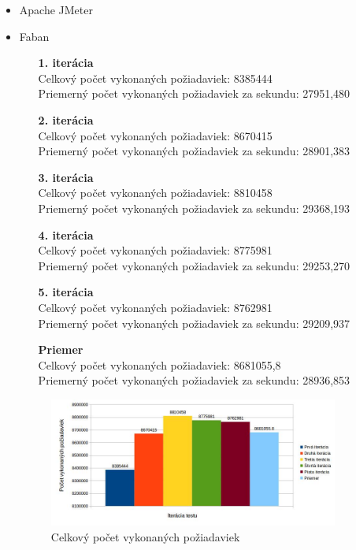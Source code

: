 \documentclass[12pt,oneside,final]{fithesis-utf8}
\begin{document}
\begin{itemize}

\item Apache JMeter

\item Faban

\begin{itemize}

\item[\textbf{1. iterácia}]\ \\
Celkový počet vykonaných požiadaviek: 8385444\\
Priemerný počet vykonaných požiadaviek za sekundu: 27951,480

\item[\textbf{2. iterácia}]\ \\
Celkový počet vykonaných požiadaviek: 8670415\\
Priemerný počet vykonaných požiadaviek za sekundu: 28901,383

\item[\textbf{3. iterácia}]\ \\
Celkový počet vykonaných požiadaviek: 8810458\\
Priemerný počet vykonaných požiadaviek za sekundu: 29368,193

\item[\textbf{4. iterácia}]\ \\
Celkový počet vykonaných požiadaviek: 8775981\\
Priemerný počet vykonaných požiadaviek za sekundu: 29253,270

\item[\textbf{5. iterácia}]\ \\
Celkový počet vykonaných požiadaviek: 8762981\\
Priemerný počet vykonaných požiadaviek za sekundu: 29209,937

\item[\textbf{Priemer}]\ \\
Celkový počet vykonaných požiadaviek: 8681055,8\\
Priemerný počet vykonaných požiadaviek za sekundu: 28936,853

\end{itemize}

\begin{figure}[H]
  \centering
      \includegraphics[width=0.9\textwidth]{faban7.jpg}
  \caption{Celkový počet vykonaných požiadaviek}
\end{figure}


\end{itemize}
\end{document}
